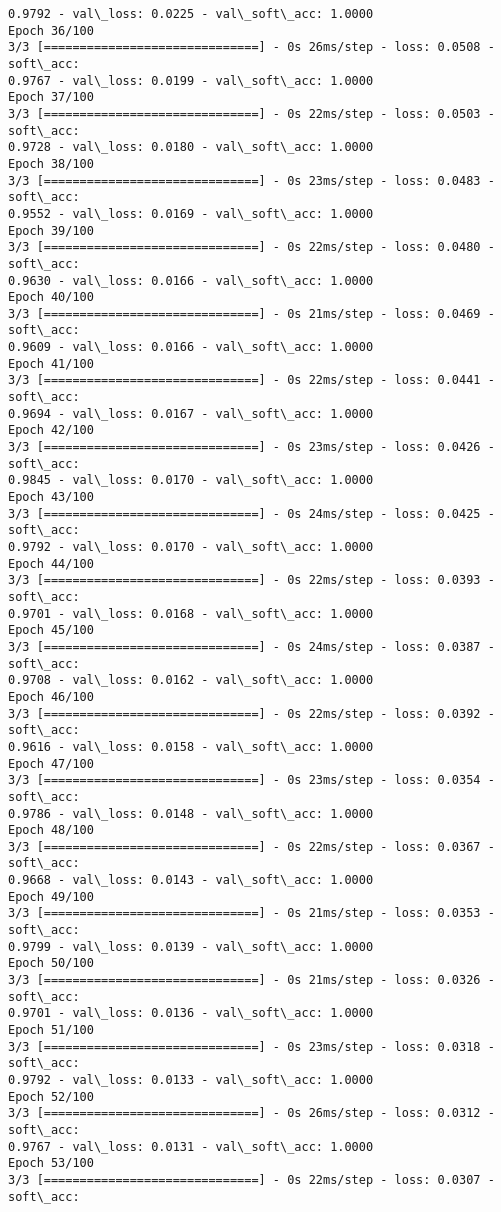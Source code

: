 \documentclass[11pt]{article}
\begin{document}
\begin{Verbatim}[commandchars=\\\{\}]
0.9792 - val\_loss: 0.0225 - val\_soft\_acc: 1.0000
Epoch 36/100
3/3 [==============================] - 0s 26ms/step - loss: 0.0508 - soft\_acc:
0.9767 - val\_loss: 0.0199 - val\_soft\_acc: 1.0000
Epoch 37/100
3/3 [==============================] - 0s 22ms/step - loss: 0.0503 - soft\_acc:
0.9728 - val\_loss: 0.0180 - val\_soft\_acc: 1.0000
Epoch 38/100
3/3 [==============================] - 0s 23ms/step - loss: 0.0483 - soft\_acc:
0.9552 - val\_loss: 0.0169 - val\_soft\_acc: 1.0000
Epoch 39/100
3/3 [==============================] - 0s 22ms/step - loss: 0.0480 - soft\_acc:
0.9630 - val\_loss: 0.0166 - val\_soft\_acc: 1.0000
Epoch 40/100
3/3 [==============================] - 0s 21ms/step - loss: 0.0469 - soft\_acc:
0.9609 - val\_loss: 0.0166 - val\_soft\_acc: 1.0000
Epoch 41/100
3/3 [==============================] - 0s 22ms/step - loss: 0.0441 - soft\_acc:
0.9694 - val\_loss: 0.0167 - val\_soft\_acc: 1.0000
Epoch 42/100
3/3 [==============================] - 0s 23ms/step - loss: 0.0426 - soft\_acc:
0.9845 - val\_loss: 0.0170 - val\_soft\_acc: 1.0000
Epoch 43/100
3/3 [==============================] - 0s 24ms/step - loss: 0.0425 - soft\_acc:
0.9792 - val\_loss: 0.0170 - val\_soft\_acc: 1.0000
Epoch 44/100
3/3 [==============================] - 0s 22ms/step - loss: 0.0393 - soft\_acc:
0.9701 - val\_loss: 0.0168 - val\_soft\_acc: 1.0000
Epoch 45/100
3/3 [==============================] - 0s 24ms/step - loss: 0.0387 - soft\_acc:
0.9708 - val\_loss: 0.0162 - val\_soft\_acc: 1.0000
Epoch 46/100
3/3 [==============================] - 0s 22ms/step - loss: 0.0392 - soft\_acc:
0.9616 - val\_loss: 0.0158 - val\_soft\_acc: 1.0000
Epoch 47/100
3/3 [==============================] - 0s 23ms/step - loss: 0.0354 - soft\_acc:
0.9786 - val\_loss: 0.0148 - val\_soft\_acc: 1.0000
Epoch 48/100
3/3 [==============================] - 0s 22ms/step - loss: 0.0367 - soft\_acc:
0.9668 - val\_loss: 0.0143 - val\_soft\_acc: 1.0000
Epoch 49/100
3/3 [==============================] - 0s 21ms/step - loss: 0.0353 - soft\_acc:
0.9799 - val\_loss: 0.0139 - val\_soft\_acc: 1.0000
Epoch 50/100
3/3 [==============================] - 0s 21ms/step - loss: 0.0326 - soft\_acc:
0.9701 - val\_loss: 0.0136 - val\_soft\_acc: 1.0000
Epoch 51/100
3/3 [==============================] - 0s 23ms/step - loss: 0.0318 - soft\_acc:
0.9792 - val\_loss: 0.0133 - val\_soft\_acc: 1.0000
Epoch 52/100
3/3 [==============================] - 0s 26ms/step - loss: 0.0312 - soft\_acc:
0.9767 - val\_loss: 0.0131 - val\_soft\_acc: 1.0000
Epoch 53/100
3/3 [==============================] - 0s 22ms/step - loss: 0.0307 - soft\_acc:

\end{Verbatim}
\end{document}
